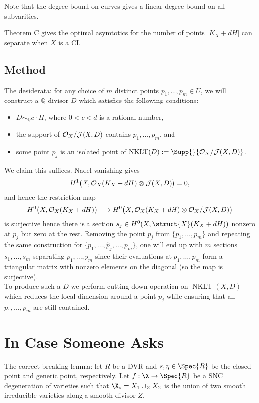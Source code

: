 \documentclass[12pt]{article}
\theoremstyle{plain}
\DeclareMathOperator{\NKLT}{NKLT}
\newcommand{\mb}[1]{\mathbb{#1}}
\begin{document}
Note that the degree bound on curves gives a linear degree bound on all subvarities. 

\begin{rmk}
Theorem C gives the optimal asymtotics for the number of points $|K_X + d H|$ can separate when $X$ is a CI.
\end{rmk}

\subsection{Method}

The desiderata: for any choice of $m$ distinct points $p_1,...,p_m \in U$, we will construct a $\mb{Q}$-divisor $D$ which satisfies the following conditions:
    \begin{itemize}
        \item $D \sim_{\mb{Q}} c \cdot H$, where $0 < c < d$ is a rational number,
        \item the support of $\mathcal{O}_X/\mathcal{J}(X,D)$ contains $p_1,...,p_m$, and
        \item some point $p_{j}$ is an isolated point of $\NKLT(D) := \Supp{}{\mtc{O}_X/\mtc{J}(X,D)}$.
    \end{itemize}
We claim this suffices. Nadel vanishing gives
    \[ H^1\big(X,\mathcal{O}_X(K_X + d H)\otimes \mathcal{J}(X, D)\big) = 0, \]
    and hence the restriction map
    \[ H^0\big(X,\mathcal{O}_X(K_X + d H)\big) \longrightarrow H^0\big(X, \mathcal{O}_X(K_X + d H)\otimes \mathcal{O}_X/\mathcal{J}(X,D) \big) \]
    is surjective hence there is a section $s_j \in H^0(X, \struct{X}(K_X + d H))$ nonzero at $p_j$ but zero at the rest. Removing the point $p_{j}$ from $\{p_1, \ldots, p_m\}$ and repeating the same construction for $\{p_1, \ldots, \hat{p}_{j}, \ldots, p_m \}$, one will end up with $m$ sections $s_1, \dots, s_m$ separating $p_1,...,p_m$ since their evaluations at $p_1, \dots, p_m$ form a triangular matrix with nonzero elements on the diagonal (so the map is surjective). 
\bigskip\\
To produce such a $D$ we perform cutting down operation on $\NKLT(X, D)$ which reduces the local dimension around a point $p_j$ while ensuring that all $p_1, \dots, p_m$ are still contained. 

\section{In Case Someone Asks}

The correct breaking lemma: let $R$ be a DVR and $s,\eta \in \Spec{R}$ be the closed point and generic point, respectively. Let $f : \X \to \Spec{R}$ be a SNC degeneration of varieties such that $\X_s = X_1 \cup_Z X_2$ is the union of two smooth irreducible varieties along a smooth divisor $Z$. 
\end{document}
